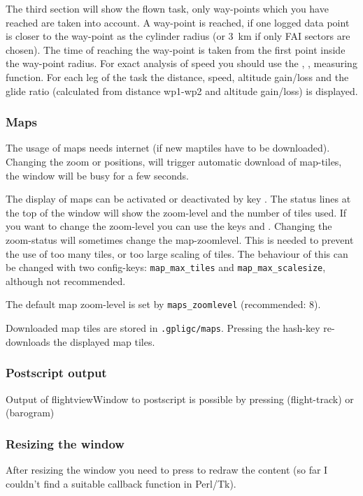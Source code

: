 The third section will show the flown task, only way-points which you have reached are taken into account. A way-point is reached, if one logged data point is closer to the way-point as the cylinder radius (or 3~km if only FAI sectors are chosen). The time of reaching the way-point is taken from the first point inside the way-point radius.
For exact analysis of speed you should use the , ,  measuring function.
For each leg of the task the distance, speed, altitude gain/loss and the glide ratio (calculated from distance wp1-wp2 and altitude gain/loss) is displayed.


\subsubsection{Maps}
The usage of maps needs internet (if new maptiles have to be downloaded).
Changing the zoom or positions, will trigger automatic download of map-tiles, the window will be busy for a few seconds.

The display of maps can be activated or deactivated by key .
The status lines at the top of the window will show the zoom-level and the number of tiles used.
If you want to change the zoom-level you can use the keys \keys{{+}} and \keys{--}.
Changing the zoom-status will sometimes change the map-zoomlevel. This is needed to prevent
the use of too many tiles, or too large scaling of tiles.
The behaviour of this can be changed with two config-keys:
\texttt{map\_max\_tiles}
and \texttt{map\_max\_scalesize}, although not recommended.

The default map zoom-level is set by \texttt{maps\_zoomlevel} (recommended: 8).

Downloaded map tiles are stored in \texttt{.gpligc/maps}. Pressing the hash-key \keys{\#} re-downloads the displayed map tiles.


\subsubsection{Postscript output}
Output of flightviewWindow to postscript is possible by pressing  (flight-track)
or  (barogram)

\subsubsection{Resizing the window}
After resizing the window you need to press  to redraw the content (so far I couldn't find a suitable callback function in Perl/Tk).


